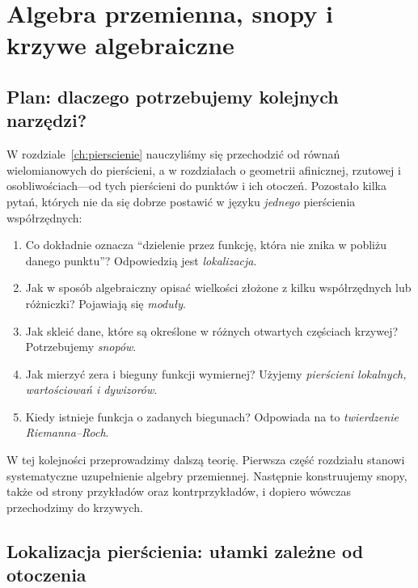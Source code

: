 \chapter{Algebra przemienna, snopy i krzywe algebraiczne}
\label{ch:krzywe-snopy}

\section{Plan: dlaczego potrzebujemy kolejnych narzędzi?}
\label{sec:plan-krzywe}
W rozdziale~\ref{ch:pierscienie} nauczyliśmy się przechodzić od równań
wielomianowych do pierścieni, a w rozdziałach o geometrii afinicznej,
rzutowej i osobliwościach---od tych pierścieni do punktów i ich
otoczeń. Pozostało kilka pytań, których nie da się dobrze postawić
w języku \emph{jednego} pierścienia współrzędnych:
\begin{enumerate}[label=\arabic*)]
\item Co dokładnie oznacza ``dzielenie przez funkcję, która nie znika
w pobliżu danego punktu''? Odpowiedzią jest \emph{lokalizacja}.
\item Jak w sposób algebraiczny opisać wielkości złożone z kilku
współrzędnych lub różniczki? Pojawiają się \emph{moduły}.
\item Jak skleić dane, które są określone w różnych otwartych częściach
krzywej? Potrzebujemy \emph{snopów}.
\item Jak mierzyć zera i bieguny funkcji wymiernej? Użyjemy
\emph{pierścieni lokalnych, wartościowań i dywizorów}.
\item Kiedy istnieje funkcja o zadanych biegunach? Odpowiada na to
\emph{twierdzenie Riemanna--Roch}.
\end{enumerate}
W tej kolejności przeprowadzimy dalszą teorię. Pierwsza część
rozdziału stanowi systematyczne uzupełnienie algebry przemiennej.
Następnie konstruujemy snopy, także od strony przykładów oraz
kontrprzykładów, i dopiero wówczas przechodzimy do krzywych.

\section{Lokalizacja pierścienia: ułamki zależne od otoczenia}
\label{sec:lokalizacja}

